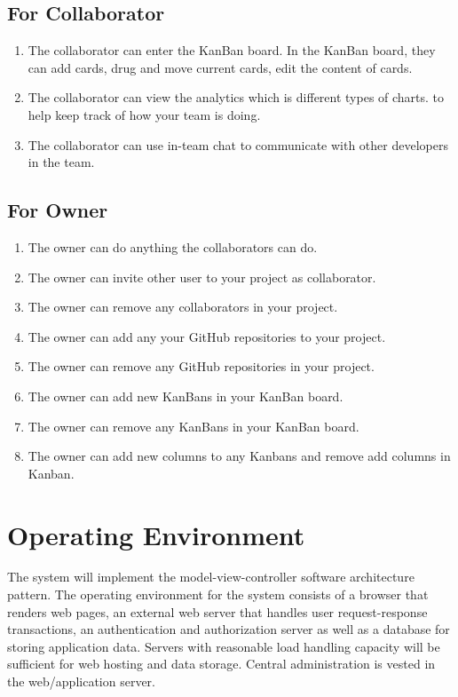\documentclass[12pt,a4paper]{report}
\begin{document}
	\subsection{For Collaborator}
	\begin{enumerate}
		\renewcommand{\labelenumi}{{\textbf{\arabic{enumi}.}}}
		\item The collaborator can enter the KanBan board. In the KanBan board, they can add cards, drug and move current cards, edit the content of cards.
		\item The collaborator can view the analytics which is different types of charts. to help keep track of how your team is doing.
		\item The collaborator can use in-team chat to communicate with other developers in the team.
	\end{enumerate}
	\subsection{For Owner}
	\begin{enumerate}
		\renewcommand{\labelenumi}{{\textbf{\arabic{enumi}.}}}
		\item The owner can do anything the collaborators can do.
		\item The owner can invite other user to your project as collaborator.
		\item The owner can remove any collaborators in your project.
		\item The owner can add any your GitHub repositories to your project.
		\item The owner can remove any GitHub repositories in your project.
		\item The owner can add new KanBans in your KanBan board.
		\item The owner can remove any KanBans in your KanBan board.
		\item The owner can add new columns to any Kanbans and remove add columns in Kanban.
	\end{enumerate}
\section{Operating Environment}
The system will implement the model-view-controller software architecture pattern. The operating environment for the system consists of a browser that renders web pages, an external web server that handles user request-response transactions, an authentication and authorization server as well as a database for storing application data. Servers with reasonable load handling capacity will be sufficient for web hosting and data storage. Central administration is vested in the web/application server. 
\end{document}
